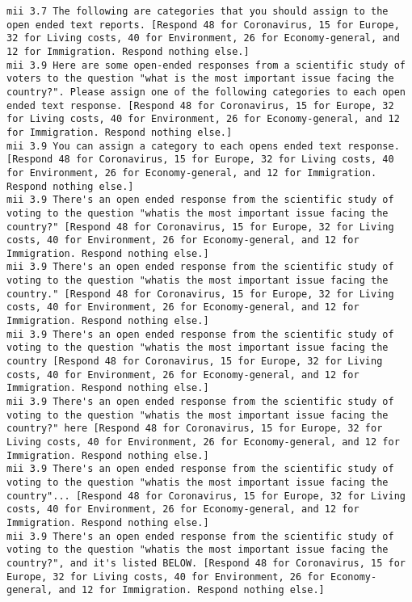 \begin{lstlisting}[label=lst:promptvariants]
mii	3.7	The following are categories that you should assign to the open ended text reports. [Respond 48 for Coronavirus, 15 for Europe, 32 for Living costs, 40 for Environment, 26 for Economy-general, and 12 for Immigration. Respond nothing else.]
mii	3.9	Here are some open-ended responses from a scientific study of voters to the question "what is the most important issue facing the country?". Please assign one of the following categories to each open ended text response. [Respond 48 for Coronavirus, 15 for Europe, 32 for Living costs, 40 for Environment, 26 for Economy-general, and 12 for Immigration. Respond nothing else.]
mii	3.9	You can assign a category to each opens ended text response. [Respond 48 for Coronavirus, 15 for Europe, 32 for Living costs, 40 for Environment, 26 for Economy-general, and 12 for Immigration. Respond nothing else.]
mii	3.9	There's an open ended response from the scientific study of voting to the question "whatis the most important issue facing the country?" [Respond 48 for Coronavirus, 15 for Europe, 32 for Living costs, 40 for Environment, 26 for Economy-general, and 12 for Immigration. Respond nothing else.]
mii	3.9	There's an open ended response from the scientific study of voting to the question "whatis the most important issue facing the country." [Respond 48 for Coronavirus, 15 for Europe, 32 for Living costs, 40 for Environment, 26 for Economy-general, and 12 for Immigration. Respond nothing else.]
mii	3.9	There's an open ended response from the scientific study of voting to the question "whatis the most important issue facing the country [Respond 48 for Coronavirus, 15 for Europe, 32 for Living costs, 40 for Environment, 26 for Economy-general, and 12 for Immigration. Respond nothing else.]
mii	3.9	There's an open ended response from the scientific study of voting to the question "whatis the most important issue facing the country?" here [Respond 48 for Coronavirus, 15 for Europe, 32 for Living costs, 40 for Environment, 26 for Economy-general, and 12 for Immigration. Respond nothing else.]
mii	3.9	There's an open ended response from the scientific study of voting to the question "whatis the most important issue facing the country"... [Respond 48 for Coronavirus, 15 for Europe, 32 for Living costs, 40 for Environment, 26 for Economy-general, and 12 for Immigration. Respond nothing else.]
mii	3.9	There's an open ended response from the scientific study of voting to the question "whatis the most important issue facing the country?", and it's listed BELOW. [Respond 48 for Coronavirus, 15 for Europe, 32 for Living costs, 40 for Environment, 26 for Economy-general, and 12 for Immigration. Respond nothing else.]

\end{lstlisting}
